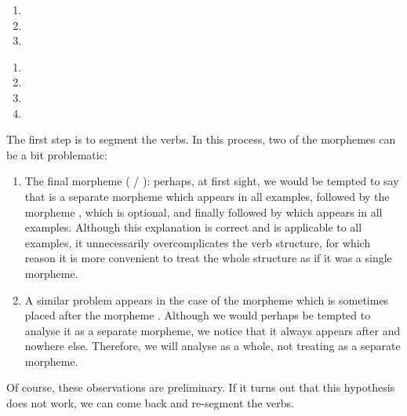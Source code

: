 \begin{refsection}
\begin{problem}{\langnameItelmen}{\nameYTestelets}{}
\begin{assgts}
\item \transinen
\begin{enumerate}
    \item {}
    \item {}
    \item {}
\end{enumerate}
\item \transinen[\langnameItelmen]
\begin{enumerate}
    \item {}
    \item {}
    \item {}
    \item {}
\end{enumerate}
\end{assgts}
\end{problem}

\begin{mysolution}
 The first step is to segment the verbs. In this process, two of the morphemes can be a bit problematic:
\begin{enumerate}
\item The final morpheme ( / ): perhaps, at first sight, we would be tempted to say that  is a separate morpheme which appears in all examples, followed by the morpheme , which is optional, and finally followed by  which appears in all examples. Although this explanation is correct and is applicable to all examples, it unnecessarily overcomplicates the verb structure, for which reason it is more convenient to treat the whole structure as if it was a single morpheme.
\item A similar problem appears in the case of the morpheme  which is sometimes placed after the morpheme . Although we would perhaps be tempted to analyse it as a separate morpheme, we notice that it always appears after  and nowhere else. Therefore, we will analyse  as a whole, not treating  as a separate morpheme.
\end{enumerate}

 Of course, these observations are preliminary. If it turns out that this hypothesis does not work, we can come back and re-segment the verbs.


\end{mysolution}
\end{refsection}
